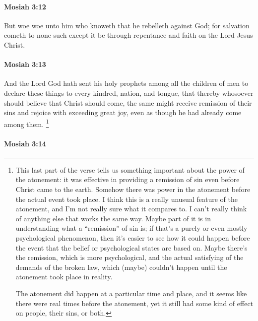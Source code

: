 		\paragraph{Mosiah 3:12} %
			\label{MOSIAH-3-12}

			But woe woe unto him who knoweth that he rebelleth against God;
			for salvation cometh to none such
			except it be through repentance and faith on the Lord Jesus Christ.

		\paragraph{Mosiah 3:13} %
			\label{MOSIAH-3-13}

			And the Lord God hath sent his holy prophets among all the children of men
			to declare these things to every kindred, nation, and tongue,
			that thereby whosoever should believe that Christ should come,
			the same might receive remission of their sins
			and rejoice with exceeding great joy,
			even as though he had already come among them.%
				\footnote{%
					\label{MOSIAH-3-13-already-come}%
					This last part of the verse tells us something important about the power of the atonement: it was effective in providing a remission of sin even before Christ came to the earth. Somehow there was power in the atonement before the actual event took place. I think this is a really unusual feature of the atonement, and I'm not really sure what it compares to. I can't really think of anything else that works the same way. Maybe part of it is in understanding what a ``remission'' of sin is; if that's a purely or even mostly psychological phenomenon, then it's easier to see how it could happen before the event that the belief or psychological states are based on. Maybe there's the remission, which is more psychological, and the actual satisfying of the demands of the broken law, which (maybe) couldn't happen until the atonement took place in reality. 
					
					The atonement did happen at a particular time and place, and it seems like there were real times before the atonement, yet it still had some kind of effect on people, their sins, or both.
					}

		\paragraph{Mosiah 3:14} %
			\label{MOSIAH-3-14}

